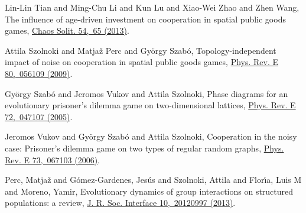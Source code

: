 \documentclass[twocolumn,aps,amsmath,pre,floatfix,superscriptaddress]{revtex4-2}
\begin{document}
\begin{thebibliography}{10}
Lin-Lin Tian and Ming-Chu Li and Kun Lu and Xiao-Wei Zhao and Zhen Wang,
{The influence of age-driven investment on cooperation in spatial public goods games},
\href {https://doi.org/10.1016/j.chaos.2013.05.017}
{Chaos Solit. 54,~65 (2013)}.

Attila Szolnoki and Matja{\v{z}} Perc and György Szab{\'{o}},
{Topology-independent impact of noise on cooperation in spatial public goods games},
\href {https://doi.org/10.1103/PhysRevE.80.056109}
{Phys. Rev. E 80,~056109 (2009)}.

György Szab{\'{o}} and Jeromos Vukov and Attila Szolnoki,
{Phase diagrams for an evolutionary prisoner's dilemma game on two-dimensional lattices},
\href {https://doi.org/10.1103/PhysRevE.72.047107}
{Phys. Rev. E 72,~047107 (2005)}.

Jeromos Vukov and György Szab{\'{o}} and Attila Szolnoki,
{Cooperation in the noisy case: Prisoner's dilemma game on two types of regular random graphs},
\href {https://doi.org/10.1103/PhysRevE.73.067103}
{Phys. Rev. E 73,~067103 (2006)}.

Perc, Matja{\v{z}} and G{\'o}mez-Gardenes, Jes{\'u}s and Szolnoki, Attila and Flor{\'\i}a, Luis M and Moreno, Yamir,
{Evolutionary dynamics of group interactions on structured populations: a review},
\href {https://doi.org/10.1098/rsif.2012.0997}
{J. R. Soc. Interface 10,~20120997 (2013)}.






\end{thebibliography}
\end{document}
